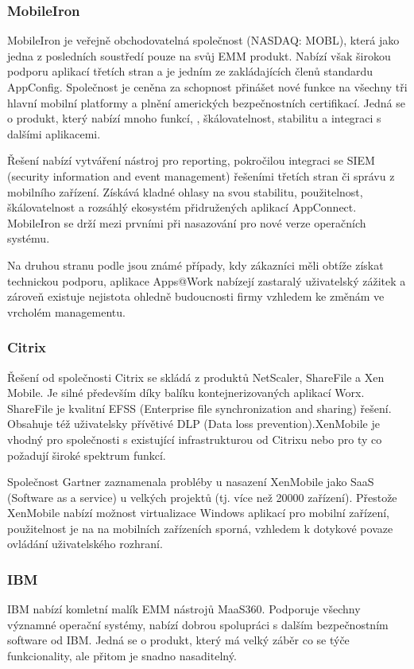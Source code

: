 \subsubsection{MobileIron}
MobileIron je veřejně obchodovatelná společnost (NASDAQ: MOBL), která jako jedna z posledních soustředí pouze na svůj EMM produkt. Nabízí však širokou podporu aplikací třetích stran a je jedním ze zakládajících členů standardu AppConfig. Společnost je ceněna za schopnost přinášet nové funkce na všechny tři hlavní mobilní platformy a plnění amerických bezpečnostních certifikací. Jedná se o produkt, který nabízí mnoho funkcí, , škálovatelnost, stabilitu a integraci s dalšími aplikacemi.

Řešení nabízí vytváření nástroj pro reporting, pokročilou integraci se SIEM (security information and event management) řešeními třetích stran či správu z mobilního zařízení. Získává kladné ohlasy na svou stabilitu, použitelnost, škálovatelnost a rozsáhlý ekosystém přidružených aplikací AppConnect. MobileIron se drží mezi prvními při nasazování pro nové verze operačních systému.

Na druhou stranu podle  jsou známé případy, kdy zákazníci měli obtíže získat technickou podporu, aplikace Apps@Work nabízejí zastaralý uživatelský zážitek a zároveň existuje nejistota ohledně budoucnosti firmy vzhledem ke změnám ve vrcholém managementu.

\subsubsection{Citrix}
Řešení od společnosti Citrix se skládá z produktů NetScaler, ShareFile a Xen Mobile. Je silné především díky balíku kontejnerizovaných aplikací Worx. ShareFile je kvalitní EFSS (Enterprise file synchronization and sharing) řešení. Obsahuje též uživatelsky přívětivé DLP (Data loss prevention).XenMobile je vhodný pro společnosti s existující infrastrukturou od Citrixu nebo pro ty co požadují široké spektrum funkcí.

Společnost Gartner zaznamenala probléby u nasazení XenMobile jako SaaS (Software as a service) u velkých projektů (tj. více než 20000 zařízení). Přestože XenMobile nabízí možnost virtualizace Windows aplikací pro mobilní zařízení, použitelnost je na na mobilních zařízeních sporná, vzhledem k dotykové povaze ovládání uživatelského rozhraní. 


\subsubsection{IBM}
IBM nabízí komletní malík EMM nástrojů MaaS360. Podporuje všechny významné operační systémy, nabízí dobrou spolupráci s dalším bezpečnostním software od IBM. Jedná se o produkt, který má velký záběr co se týče funkcionality, ale přitom je snadno nasaditelný.



